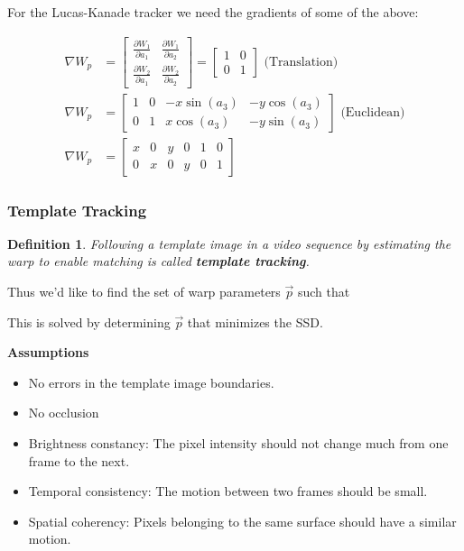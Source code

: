 \documentclass[10pt,a4paper]{scrartcl}
\newtheorem{define}{Definition}
\begin{document}
\begin{multicols*}{2}
For the Lucas-Kanade tracker we need the gradients of some of the above:

\begin{align*}
\nabla W_p &= \begin{bmatrix}
\frac{\partial W_1}{\partial a_1}&\frac{\partial W_1}{\partial a_2}\\
\frac{\partial W_2}{\partial a_1}&\frac{\partial W_2}{\partial a_2}
\end{bmatrix}=\begin{bmatrix}
1&0\\0&1
\end{bmatrix}\text{ (Translation)}\\
\nabla W_p &= \begin{bmatrix}
1&0&-x\sin(a_3)&-y\cos(a_3)\\
0&1&x\cos(a_3)&-y\sin(a_3)
\end{bmatrix}\text{ (Euclidean)}\\
\nabla W_p &= \begin{bmatrix}
x&0&y&0&1&0\\
0&x&0&y&0&1
\end{bmatrix}
\end{align*}

\subsubsection{Template Tracking}

\begin{define}
Following a template image in a video sequence by estimating the warp to enable matching is called \textbf{template tracking}.
\end{define}

Thus we'd like to find the set of warp parameters $\vec{p}$ such that


This is solved by determining $\vec{p}$ that minimizes the SSD.


\textbf{Assumptions}
\begin{itemize}
\item No errors in the template image boundaries.
\item No occlusion
\item Brightness constancy: The pixel intensity should not change much from one frame to the next.
\item Temporal consistency: The motion between two frames should be small.
\item Spatial coherency: Pixels belonging to the same surface should have a similar motion.
\end{itemize}


\end{multicols*}
\end{document}
